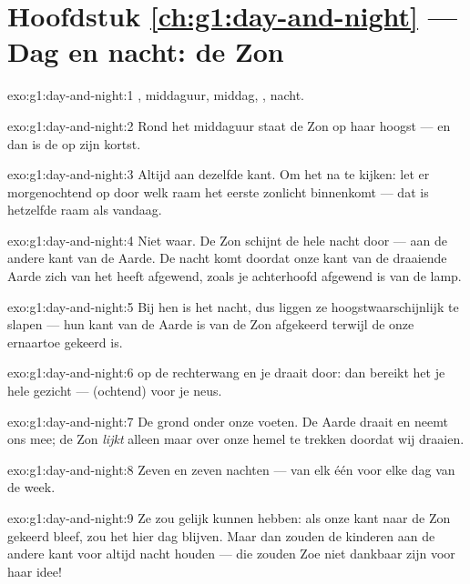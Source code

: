 \section*{Hoofdstuk \ref{ch:g1:day-and-night} --- Dag en nacht: de Zon}

\begin{solution}{exo:g1:day-and-night:1}
, middaguur, middag, , nacht.
\end{solution}

\begin{solution}{exo:g1:day-and-night:2}
Rond het middaguur staat de Zon op haar hoogst --- en dan is de
 op zijn kortst.
\end{solution}

\begin{solution}{exo:g1:day-and-night:3}
Altijd aan dezelfde kant. Om het na te kijken: let er morgenochtend
op door welk raam het eerste zonlicht binnenkomt --- dat is hetzelfde
raam als vandaag.
\end{solution}

\begin{solution}{exo:g1:day-and-night:4}
Niet waar. De Zon schijnt de hele nacht door --- aan de andere kant
van de Aarde. De nacht komt doordat onze kant van de draaiende Aarde
zich van het  heeft afgewend, zoals je achterhoofd afgewend is van
de lamp.
\end{solution}

\begin{solution}{exo:g1:day-and-night:5}
Bij hen is het nacht, dus liggen ze hoogstwaarschijnlijk te slapen
--- hun kant van de Aarde is van de Zon afgekeerd terwijl de onze
ernaartoe gekeerd is.
\end{solution}

\begin{solution}{exo:g1:day-and-night:6}
 op de rechterwang en je draait door: dan bereikt het
 je hele gezicht ---  (ochtend) voor je neus.
\end{solution}

\begin{solution}{exo:g1:day-and-night:7}
De grond onder onze voeten. De Aarde draait en neemt ons mee; de Zon
\emph{lijkt} alleen maar over onze hemel te trekken doordat wij
draaien.
\end{solution}

\begin{solution}{exo:g1:day-and-night:8}
Zeven  en zeven nachten --- van elk één voor elke dag van
de week.
\end{solution}

\begin{solution}{exo:g1:day-and-night:9}
Ze zou gelijk kunnen hebben: als onze kant naar de Zon gekeerd bleef,
zou het hier dag blijven. Maar dan zouden de kinderen aan de andere
kant voor altijd nacht houden --- die zouden Zoe niet dankbaar zijn
voor haar idee!
\end{solution}
